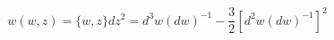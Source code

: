 \begin{equation}
w(w,z)=\{w,z\}dz^{2}=d^{3}w(dw)^{-1}-\frac{3}{2}[d^{2}w (dw)^{-1}]^{2}
\end{equation}

